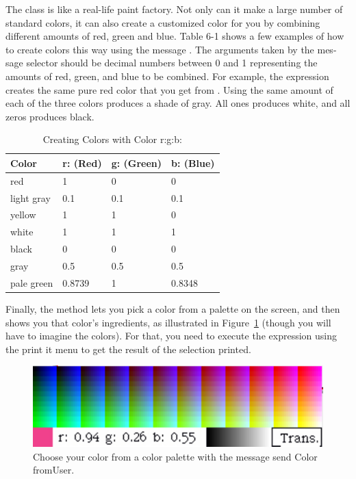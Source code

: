 \documentclass[a4paper,10pt,twoside]{book}
\begin{document}
The  class is like a real-life paint factory. Not only can it make a large number of 
standard colors, it can also create a customized color for you by combining different amounts 
of red, green and blue. Table 6-1 shows a few examples of how to create colors this way using 
the message . The arguments taken by the mes- 
sage selector  should be decimal numbers between 0 and 1 representing the amounts of 
red, green, and blue to be combined. For example, the expression  creates the same pure red color that you get from . Using the same amount of each of the three colors produces a shade of gray. All ones produces white, and all zeros produces  black. 

\noindent
\begin{table}[h!]
\caption{Creating Colors with \textsf{\upshape Color r:g:b:}}
\label{tab0601}
\begin{center}
{\small \begin{tabular}{p{20mm}p{20mm}p{20mm}p{20mm}}
\hline
{\small \textbf{Color}} & {\small \textbf{r: (Red)}} & {\small \textbf{g: (Green)}} & {\small \textbf{b: (Blue)}}\\
\hline
{\small red} & {\small 1} & {\small 0} & {\small 0}\\
{\small light gray} & {\small 0.1} & {\small 0.1} & {\small 0.1}\\
{\small yellow} & {\small 1} & {\small 1} & {\small 0}\\
{\small white} & {\small 1} & {\small 1} & {\small 1}\\
{\small black} & {\small 0} & {\small 0} & {\small 0}\\
{\small gray} & {\small 0.5} & {\small 0.5} & {\small 0.5}\\
{\small pale green} & {\small 0.8739} & {\small 1} & {\small 0.8348}\\
\hline
\end{tabular}}
\end{center}
\end{table}

Finally, the method  lets you pick a color from a palette on the screen, and then 
shows you that color’s ingredients, as illustrated in Figure~\ref{fig:palette} (though you will have to imagine 
the colors). For that, you need to execute the expression  using the print it 
menu to get the result of the selection printed. 

\begin{figure}[h]
	\centerline{\includegraphics{colorFromUser}}
	\caption{Choose your color from a color palette with the message send Color fromUser. 
	\label{fig:palette}}
\end{figure}
\end{document}
